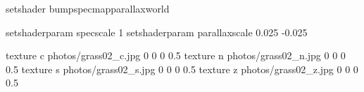 setshader bumpspecmapparallaxworld

setshaderparam specscale 1
setshaderparam parallaxscale 0.025 -0.025

texture c photos/grass02_c.jpg 0 0 0 0.5
texture n photos/grass02_n.jpg 0 0 0 0.5
texture s photos/grass02_s.jpg 0 0 0 0.5
texture z photos/grass02_z.jpg 0 0 0 0.5
